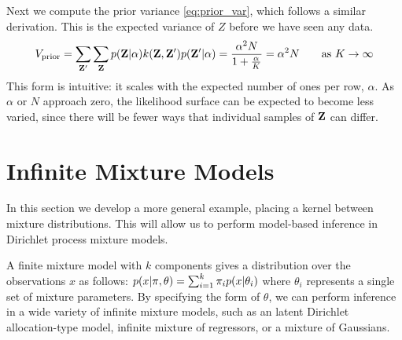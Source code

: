 Next we compute the prior variance \eqref{eq:prior_var}, which follows a similar derivation.  This is the expected variance of $Z$ before we have seen any data.
\begin{align}
V_{\textrm{prior}} 
 = \sum_{\mathbf{Z}'} \sum_{\mathbf{Z}} p(\mathbf{Z} | \alpha) k(\mathbf{Z}, \mathbf{Z}') p(\mathbf{Z}' | \alpha) 
 = \frac{\alpha^2 N}{1 + \frac{\alpha}{K}} 
 = \alpha^2 N  \qquad \textrm{as $K \rightarrow \infty$}
\label{eq:prior_variance_ibp}
\end{align}
%
This form is intuitive:  it scales with the expected number of ones per row, $\alpha$.  As $\alpha$ or $N$ approach zero, the likelihood surface can be expected to become less varied, since there will be fewer ways that individual samples of $\mathbf{Z}$ can differ.




\section{Infinite Mixture Models}

In this section we develop a more general example, placing a kernel between mixture distributions.  This will allow us to perform model-based inference in Dirichlet process mixture models.

A finite mixture model with $k$ components gives a distribution over the observations $x$ as follows:
%
$p(x | {\bf{\pi}}, {\bf{\theta}}) = \sum_{i = 1}^k \pi_i p\!\left(x\middle\vert\theta_i\right)$
%
where $\theta_i$ represents a single set of mixture parameters.  By specifying the form of $\theta$, we can perform inference in a wide variety of infinite mixture models, such as an latent Dirichlet allocation-type model, infinite mixture of regressors, or a mixture of Gaussians.


